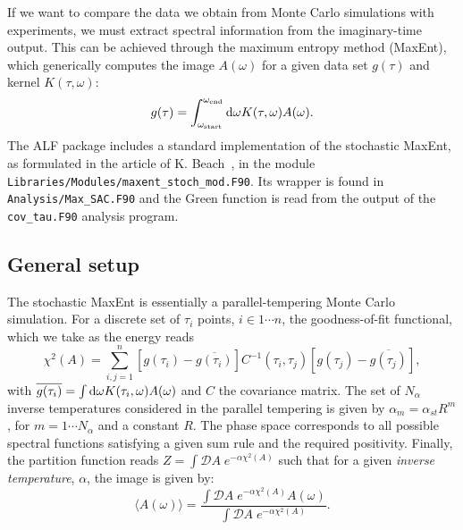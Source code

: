 

If we want to compare the data we obtain from Monte Carlo simulations with experiments, we must extract spectral information from the imaginary-time output.
This can be achieved through the maximum entropy method (MaxEnt), which generically computes the  image  $A(\omega) $ for a given  data  set $g(\tau) $  and kernel $K(\tau,\omega) $:
\begin{equation}
g(\tau) =  \int_{\omega_\mathrm{start}}^{\omega_\mathrm{end}} \mathrm{d}{\omega} K(\tau,\omega) A(\omega).
\end{equation} 
The  ALF package includes a standard implementation of the stochastic MaxEnt, as formulated in the article of K. Beach~\cite{Beach04a}, in the module \texttt{Libraries/Modules/\allowbreak{}maxent\_stoch\_mod.F90}. Its wrapper is found in \texttt{Analysis/Max\_SAC.F90} and the Green function is read from the
output of the \texttt{cov\_tau.F90} analysis program.

\subsection{General setup}

The stochastic MaxEnt is essentially a parallel-tempering Monte Carlo simulation.  For a discrete set of $\tau_i$ points,  $i \in 1 \cdots n $, the goodness-of-fit functional, which we take as the energy reads
\begin{equation}
  \chi^{2}(A) =  \sum_{i,j=1}^{n}   \left[ g(\tau_i)  -  \overline{g(\tau_i)} \right] C^{-1}(\tau_i,\tau_j) \left[    g(\tau_j)  -  \overline{g(\tau_j)} \right] ,
\end{equation}
with $ \overline{g(\tau_i)} =\int \mathrm{d}{\omega} K(\tau_{i},\omega)  A(\omega)$ and  $C$ the covariance matrix. 
The set of $N_{\alpha}$ inverse temperatures considered in the parallel tempering is given by
$ \alpha_m = \alpha_{st}  R^{m}$, for $m = 1 \cdots N_{\alpha} $ and a constant $R$. The phase space corresponds to all possible spectral functions satisfying a given sum rule and the required positivity.  Finally, the partition function reads
$Z =  \int\mathcal{D}\!A\; e^{-\alpha \chi^{2}(A)}$ \cite{Beach04a}   such that  for a given \textit{inverse  temperature},  $\alpha$, the  image is given by: 
\begin{equation}
  \langle A ( \omega) \rangle  =   \frac{\int\mathcal{D}\!A\; e^{-\alpha \chi^{2}(A)}  A(\omega) }{ \int\mathcal{D}\!A\; e^{-\alpha \chi^{2}(A)}  }.
\end{equation}


